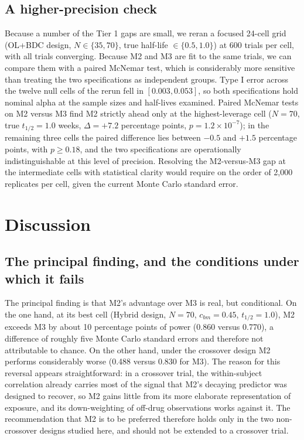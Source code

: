 \documentclass[
  11pt,
]{article}
\begin{document}
\subsection{A higher-precision check}\label{a-higher-precision-check}

Because a number of the Tier 1 gaps are small, we reran a focused
24-cell grid (OL+BDC design, \(N \in \{35, 70\}\), true half-life
\(\in \{0.5, 1.0\}\)) at 600 trials per cell, with all trials
converging. Because M2 and M3 are fit to the same trials, we can
compare them with a paired McNemar test, which is considerably more
sensitive than treating the two specifications as independent
groups. Type I error across the twelve null cells of the rerun fell
in \([0.003, 0.053]\), so both specifications hold nominal alpha at
the sample sizes and half-lives examined. Paired McNemar tests on M2
versus M3 find M2 strictly ahead only at the highest-leverage cell
(\(N = 70\), true \(t_{1/2} = 1.0\) weeks, \(\Delta = +7.2\) percentage
points, \(p = 1.2 \times 10^{-7}\)); in the remaining three cells the
paired difference lies between \(-0.5\) and \(+1.5\) percentage points,
with \(p \geq 0.18\), and the two specifications are operationally
indistinguishable at this level of precision. Resolving the
M2-versus-M3 gap at the intermediate cells with statistical clarity
would require on the order of 2,000 replicates per cell, given the
current Monte Carlo standard error.

\section{Discussion}\label{discussion}

\subsection{The principal finding, and the conditions under which it fails}\label{the-principal-finding-and-the-conditions-under-which-it-fails}

The principal finding is that M2's advantage over M3 is real, but
conditional. On the one hand, at its best cell (Hybrid design,
\(N = 70\), \(c_{bm} = 0.45\), \(t_{1/2} = 1.0\)), M2 exceeds M3 by about
10 percentage points of power (0.860 versus 0.770), a difference of
roughly five Monte Carlo standard errors and therefore not
attributable to chance. On the other hand, under the crossover
design M2 performs considerably worse (0.488 versus 0.830 for M3).
The reason for this reversal appears straightforward: in a crossover
trial, the within-subject correlation already carries most of the
signal that M2's decaying predictor was designed to recover, so M2
gains little from its more elaborate representation of exposure, and
its down-weighting of off-drug observations works against it. The
recommendation that M2 is to be preferred therefore holds only in
the two non-crossover designs studied here, and should not be
extended to a crossover trial.
\end{document}
